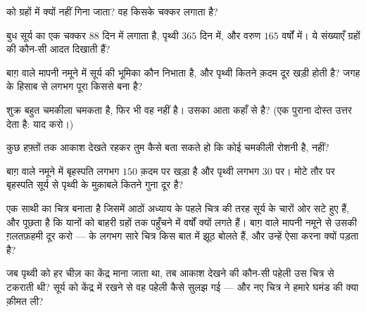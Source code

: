 \begin{exercise}[$\star$]\label{exo:g4:solar-system:4}
 को ग्रहों में क्यों नहीं गिना जाता? वह किसके चक्कर लगाता है?
\end{exercise}

\begin{exercise}[$\star$]\label{exo:g4:solar-system:5}
बुध सूर्य का एक चक्कर $88$ दिन में लगाता है, पृथ्वी $365$ दिन में,
और वरुण $165$ वर्षों में। ये संख्याएँ ग्रहों की कौन-सी आदत दिखाती
हैं?
\end{exercise}

\begin{exercise}[$\star$]\label{exo:g4:solar-system:6}
बाग़ वाले मापनी नमूने में सूर्य की भूमिका कौन निभाता है, और पृथ्वी
कितने क़दम दूर खड़ी होती है? जगह के हिसाब से  लगभग पूरा किससे
बना है?
\end{exercise}

\begin{exercise}[$\star$]\label{exo:g4:solar-system:7}
शुक्र बहुत चमकीला चमकता है, फिर भी वह  नहीं है। उसका  आता
कहाँ से है? (एक पुराना दोस्त उत्तर देता है:  याद करो।)
\end{exercise}

\begin{exercise}[$\star$]\label{exo:g4:solar-system:8}
कुछ हफ़्तों तक आकाश देखते रहकर तुम कैसे बता सकते हो कि कोई चमकीली
रोशनी  है,  नहीं?
\end{exercise}

\begin{exercise}[$\star$]\label{exo:g4:solar-system:9}
बाग़ वाले नमूने में बृहस्पति लगभग $150$ क़दम पर खड़ा है और पृथ्वी
लगभग $30$ पर। मोटे तौर पर बृहस्पति सूर्य से पृथ्वी के मुक़ाबले कितने
गुना दूर है?
\end{exercise}

\begin{exercise}[$\star\star$]\label{exo:g4:solar-system:10}
एक साथी  का चित्र बनाता है जिसमें आठों  अध्याय के पहले
चित्र की तरह सूर्य के चारों ओर सटे हुए हैं, और पूछता है कि यानों को
बाहरी ग्रहों तक पहुँचने में वर्षों क्यों लगते हैं। बाग़ वाले मापनी
नमूने से उसकी ग़लतफ़हमी दूर करो ---  के लगभग सारे चित्र किस
बात में झूठ बोलते हैं, और उन्हें ऐसा करना क्यों पड़ता है?
\end{exercise}

\begin{exercise}[$\star\star$]\label{exo:g4:solar-system:11}
जब पृथ्वी को हर चीज़ का केंद्र माना जाता था, तब आकाश देखने की कौन-सी
पहेली उस चित्र से टकराती थी? सूर्य को केंद्र में रखने से वह पहेली
कैसे सुलझ गई --- और नए चित्र ने हमारे घमंड की क्या क़ीमत ली?
\end{exercise}
